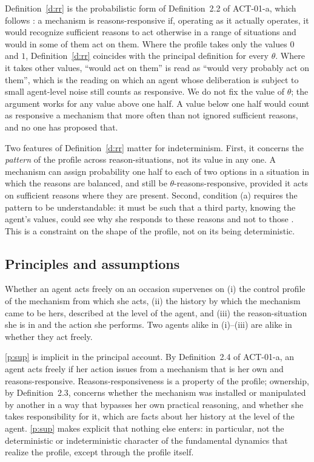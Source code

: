 \documentclass{situationist-preprint}
\begin{document}
Definition~\ref{d:rr} is the probabilistic form of Definition~2.2 of ACT-01-a, which follows \citet{FischerRavizza1998}: a mechanism is reasons-responsive if, operating as it actually operates, it would recognize sufficient reasons to act otherwise in a range of situations and would in some of them act on them. Where the profile takes only the values $0$ and $1$, Definition~\ref{d:rr} coincides with the principal definition for every $\theta$. Where it takes other values, \enquote{would act on them} is read as \enquote{would very probably act on them}, which is the reading on which an agent whose deliberation is subject to small agent-level noise still counts as responsive. We do not fix the value of $\theta$; the argument works for any value above one half. A value below one half would count as responsive a mechanism that more often than not ignored sufficient reasons, and no one has proposed that.

Two features of Definition~\ref{d:rr} matter for indeterminism. First, it concerns the \emph{pattern} of the profile across reason-situations, not its value in any one. A mechanism can assign probability one half to each of two options in a situation in which the reasons are balanced, and still be $\theta$-reasons-responsive, provided it acts on sufficient reasons where they are present. Second, condition (a) requires the pattern to be understandable: it must be such that a third party, knowing the agent's values, could see why she responds to these reasons and not to those \citep{FischerRavizza1998}. This is a constraint on the shape of the profile, not on its being deterministic.

\subsection{Principles and assumptions}

\begin{principle}\label{p:sup}
Whether an agent acts freely on an occasion supervenes on (i) the control profile of the mechanism from which she acts, (ii) the history by which the mechanism came to be hers, described at the level of the agent, and (iii) the reason-situation she is in and the action she performs. Two agents alike in (i)--(iii) are alike in whether they act freely.
\end{principle}

\ref{p:sup} is implicit in the principal account. By Definition~2.4 of ACT-01-a, an agent acts freely if her action issues from a mechanism that is her own and reasons-responsive. Reasons-responsiveness is a property of the profile; ownership, by Definition~2.3, concerns whether the mechanism was installed or manipulated by another in a way that bypasses her own practical reasoning, and whether she takes responsibility for it, which are facts about her history at the level of the agent. \ref{p:sup} makes explicit that nothing else enters: in particular, not the deterministic or indeterministic character of the fundamental dynamics that realize the profile, except through the profile itself.
\end{document}
